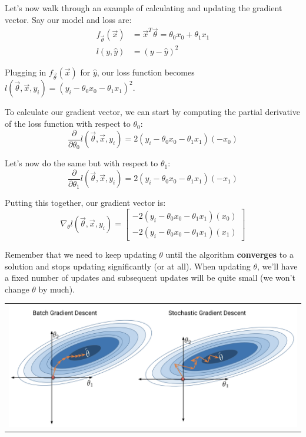 \documentclass[
  letterpaper,
  DIV=11,
  numbers=noendperiod]{scrreprt}
\begin{document}
Let's now walk through an example of calculating and updating the
gradient vector. Say our model and loss are: \[\begin{align}
f_{\vec{\theta}}(\vec{x}) &= \vec{x}^T\vec{\theta} = \theta_0x_0 + \theta_1x_1
\\l(y, \hat{y}) &= (y - \hat{y})^2
\end{align}
\]

Plugging in \(f_{\vec{\theta}}(\vec{x})\) for \(\hat{y}\), our loss
function becomes
\(l(\vec{\theta}, \vec{x}, y_i) = (y_i - \theta_0x_0 - \theta_1x_1)^2\).

To calculate our gradient vector, we can start by computing the partial
derivative of the loss function with respect to \(\theta_0\):
\[\frac{\partial}{\partial \theta_{0}} l(\vec{\theta}, \vec{x}, y_i) = 2(y_i - \theta_0x_0 - \theta_1x_1)(-x_0)\]

Let's now do the same but with respect to \(\theta_1\):
\[\frac{\partial}{\partial \theta_{1}} l(\vec{\theta}, \vec{x}, y_i) = 2(y_i - \theta_0x_0 - \theta_1x_1)(-x_1)\]

Putting this together, our gradient vector is:
\[\nabla_{\theta} l(\vec{\theta}, \vec{x}, y_i) =  \begin{bmatrix} -2(y_i - \theta_0x_0 - \theta_1x_1)(x_0) \\ -2(y_i - \theta_0x_0 - \theta_1x_1)(x_1) \end{bmatrix}\]

Remember that we need to keep updating \(\theta\) until the algorithm
\textbf{converges} to a solution and stops updating significantly (or at
all). When updating \(\theta\), we'll have a fixed number of updates and
subsequent updates will be quite small (we won't change \(\theta\) by
much).

\begin{longtable}[]{@{}l@{}}
\toprule\noalign{}
\endhead
\bottomrule\noalign{}
\endlastfoot
\includegraphics[width=6.25in,height=\textheight]{feature_engineering/images/stochastic.png} \\
\end{longtable}
\end{document}
